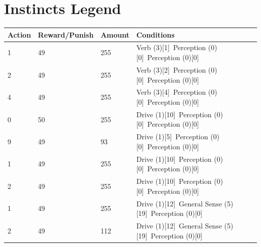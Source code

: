 \documentclass{article}
\begin{document}
\section*{Instincts Legend}

\begin{longtable}{|p{3cm}|p{3cm}|p{3cm}|p{5cm}|}
\hline
{\bf Action} & {\bf Reward/Punish} & {\bf Amount} & {\bf Conditions} \\ \hline
1 & 49 & 255 & Verb (3)[1]~\newline Perception (0)[0]~\newline Perception (0)[0]~\newline  \\ \hline
2 & 49 & 255 & Verb (3)[2]~\newline Perception (0)[0]~\newline Perception (0)[0]~\newline  \\ \hline
4 & 49 & 255 & Verb (3)[4]~\newline Perception (0)[0]~\newline Perception (0)[0]~\newline  \\ \hline
0 & 50 & 255 & Drive (1)[10]~\newline Perception (0)[0]~\newline Perception (0)[0]~\newline  \\ \hline
9 & 49 & 93 & Drive (1)[5]~\newline Perception (0)[0]~\newline Perception (0)[0]~\newline  \\ \hline
1 & 49 & 255 & Drive (1)[10]~\newline Perception (0)[0]~\newline Perception (0)[0]~\newline  \\ \hline
2 & 49 & 255 & Drive (1)[10]~\newline Perception (0)[0]~\newline Perception (0)[0]~\newline  \\ \hline
1 & 49 & 255 & Drive (1)[12]~\newline General Sense (5)[19]~\newline Perception (0)[0]~\newline  \\ \hline
2 & 49 & 112 & Drive (1)[12]~\newline General Sense (5)[19]~\newline Perception (0)[0]~\newline  \\ \hline

\end{longtable}
\end{document}
